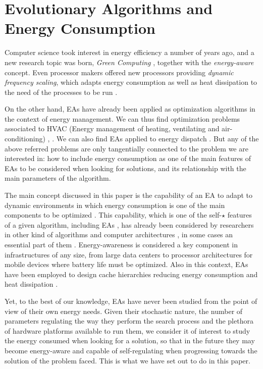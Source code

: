 \section{Evolutionary Algorithms and Energy Consumption}
\label{eas}

Computer science took interest in energy efficiency a number of years
ago, and a new research topic was born, \textit{Green Computing}
\cite{hooper2008}, together with the \textit{energy-aware}
\cite{barroso2007,energy-aware} concept. Even processor 
makers offered new processors providing \textit{dynamic frequency
  scaling}, which adapts energy consumption as well as heat dissipation
to the need of the processes to be run \cite{Bansal2004,albers2011,energy-efficient}. 


On the other hand, EAs have already been applied as optimization
algorithms in the context of energy management.  We can thus find
optimization problems associated to HVAC (Energy management of
heating, ventilating and air-conditioning) \cite{Fong2006},
\cite{Lee2011}.  We can also find EAs applied to energy dispatch
\cite{Fadaee2012}.  But any of the above referred problems are only
tangentially connected to the problem we are interested in:  how to
include energy consumption as one of the main features of EAs to be
considered when looking for solutions, and its relationship with the
main parameters of the algorithm. 

The main concept discussed in this paper is the capability of an EA to adapt
to dynamic environments in which energy consumption is one of the main
components to be optimized \cite{ephemeral2015}. This capability, which
is one of the self-$\star$ features of a
given algorithm, including EAs \cite{ephemeral2015}, has already been
considered by researchers in other kind of algorithms and computer architectures \cite{Almeida2013}, in some cases
an essential part of them \cite{energy-aware}. Energy-awareness is
considered a key
component in infrastructures of any size, from large data centers to
processor architectures for mobile devices where battery life must be
optimized.  Also in this context, EAs have been employed to design
cache hierarchies reducing energy consumption and heat dissipation
\cite{DiazAlvarez2016}. 

Yet, to the best of our knowledge, EAs have never been studied from
the point of view of their own energy needs. 
Given their stochastic nature, the number of parameters regulating the
way they perform the search process and the plethora of hardware
platforms available to run them, we consider it of interest to study
the energy consumed when looking for a solution, so that in the future
they may become energy-aware and capable of self-regulating when
progressing towards the solution of the problem faced. This is what we
have set out to do in this paper.

